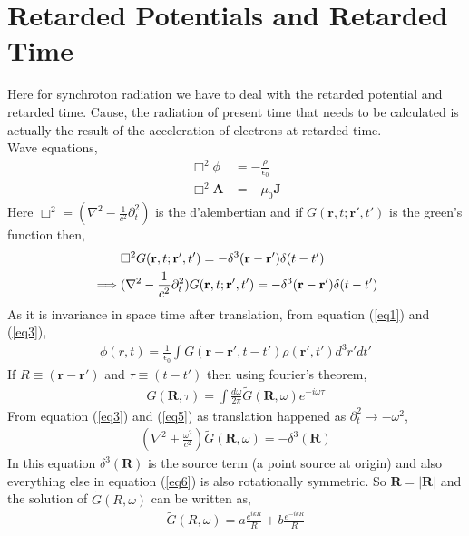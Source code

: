 \documentclass[11pt,a4paper]{article}
\begin{document}
\section*{Retarded Potentials and Retarded Time}
Here for synchroton radiation we have to deal with the retarded potential and retarded time. 
Cause, the radiation of present time that needs to be calculated is actually the result of the acceleration of electrons at retarded time. \\
Wave equations,
\begin{align}
    \Box^2 \phi &= -\frac{\rho}{\epsilon_0} \label{eq1} \\
    \Box^2 \mathbf{A} &= -\mu_0 \mathbf{J} \label{eq2}
\end{align}
Here $\Box^2 = (\nabla^2 - \frac{1}{c^2}\partial_t^2)$ is the d'alembertian and if $G(\mathbf{r},t;\mathbf{r'},t')$ is the green's function then,
\begin{align}
    &\Box^2 G(\mathbf{r},t;\mathbf{r'},t') = -\delta^3(\mathbf{r}-\mathbf{r'})\delta(t-t')\notag \\
    \implies & (\nabla^2 - \frac{1}{c^2}\partial_t^2)G(\mathbf{r},t;\mathbf{r'},t') = -\delta^3(\mathbf{r}-\mathbf{r'})\delta(t-t')
    \label{eq3}
\end{align}
As it is invariance in space time after translation, from equation (\ref{eq1}) and (\ref{eq3}),
\begin{align}
    \phi(r,t) = \frac{1}{\epsilon_0} \int G(\mathbf{r}-\mathbf{r'},t-t') \rho(\mathbf{r'},t')d^3r'dt' \label{eq4}
\end{align}
If $R\equiv (\mathbf{r}-\mathbf{r'})$ and $\tau \equiv (t-t')$ then using fourier's theorem,
\begin{align}
    G(\mathbf{R},\tau) = \int \frac{d\omega}{2\pi}\tilde{G}(\mathbf{R}, \omega) e^{-i\omega \tau} \label{eq5}
\end{align}
From equation (\ref{eq3}) and (\ref{eq5}) as translation happened as $\partial_t^2 \rightarrow -\omega^2$,
\begin{align}
     (\nabla^2 + \frac{\omega^2}{c^2})\tilde{G}(\mathbf{R}, \omega) = -\delta^3(\mathbf{R}) \label{eq6}
\end{align}
In this equation $\delta^3(\mathbf{R})$ is the source term (a point source at origin) and also everything else in equation (\ref{eq6}) is also rotationally symmetric. 
So $\mathbf{R} = |\mathbf{R}|$ and the solution of $\tilde{G}(R, \omega)$ can be written as,
\begin{align}
    \tilde{G}(R, \omega) = a\frac{e^{ikR}}{R} + b\frac{e^{-ikR}}{R} \label{eq7}
\end{align}
\end{document}
